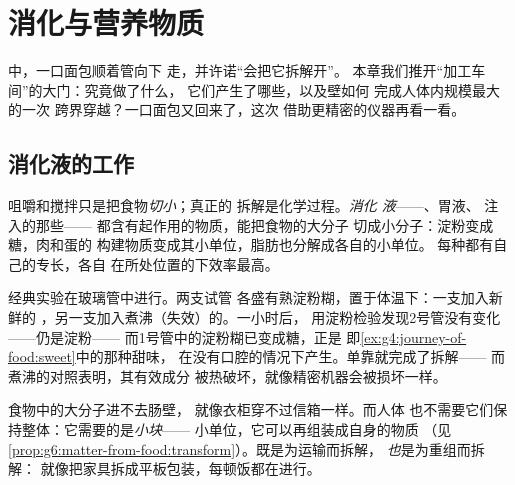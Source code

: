 \chapter{消化与营养物质}\label{ch:g7:digestion-and-nutrients}

中，一口面包顺着管向下
走，并许诺“会把它拆解开”。
本章我们推开“加工车间”的大门：究竟做了什么，
它们产生了哪些，以及壁如何
完成人体内规模最大的一次
跨界穿越？一口面包又回来了，这次
借助更精密的仪器再看一看。

\section{消化液的工作}

\begin{proposition}[消化是化学拆解]\label{prop:g7:digestion-and-nutrients:chemical}
咀嚼和搅拌只是把食物\emph{切小}；真正的
拆解是化学过程。\emph{消化
液}——、胃液、
注入的那些——
都含有起作用的物质，能把食物的大分子
切成小分子：淀粉变成糖，肉和蛋的
构建物质变成其小单位，脂肪也分解成各自的小单位。
每种都有自己的专长，各自
在所处位置的下效率最高。
\end{proposition}
\admitted

\begin{example}[实验台版本]\label{ex:g7:digestion-and-nutrients:bench}
经典实验在玻璃管中进行。两支试管
各盛有熟淀粉糊，置于体温下：一支加入新鲜的
，另一支加入煮沸（失效）的。一小时后，
用淀粉检验发现2号管没有变化——仍是淀粉——
而1号管中的淀粉糊已变成糖，正是
即\cref{ex:g4:journey-of-food:sweet}中的那种甜味，
在没有口腔的情况下产生。单靠就完成了拆解——
而煮沸的对照表明，其有效成分
被热破坏，就像精密机器会被损坏一样。
\end{example}

\begin{remark}[为什么还要拆解？]\label{rem:g7:digestion-and-nutrients:why}
食物中的大分子进不去肠壁，
就像衣柜穿不过信箱一样。而人体
也不需要它们保持整体：它需要的是\emph{小块}——
小单位，它可以再组装成自身的物质
（见\cref{prop:g6:matter-from-food:transform}）。既是为运输而拆解，
\emph{也}是为重组而拆解：
就像把家具拆成平板包装，每顿饭都在进行。
\end{remark}

